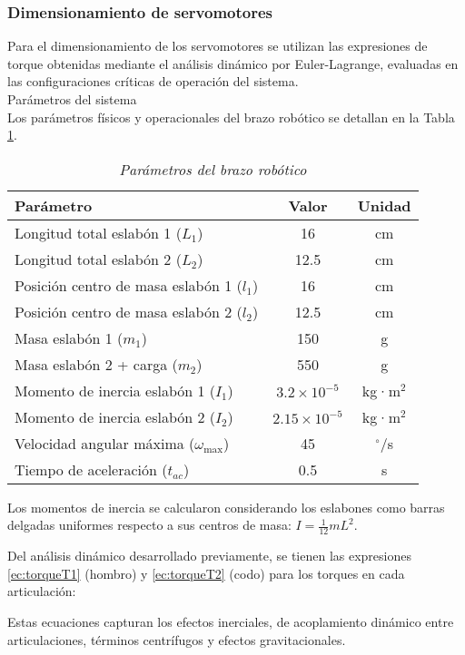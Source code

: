 \subsubsection{Dimensionamiento de servomotores}

Para el dimensionamiento de los servomotores se utilizan las expresiones de torque obtenidas mediante el análisis dinámico por Euler-Lagrange, evaluadas en las configuraciones críticas de operación del sistema.\\

Parámetros del sistema\\
\noindent
Los parámetros físicos y operacionales del brazo robótico se detallan en la Tabla \ref{tab:parametros_brazo}.

\begin{table}[htbp]
\centering
\begin{tabular}{lcc}
\hline
\textbf{Parámetro} & \textbf{Valor} & \textbf{Unidad} \\
\hline
Longitud total eslabón 1 ($L_1$) & 16 & cm \\
Longitud total eslabón 2 ($L_2$) & 12.5 & cm \\
Posición centro de masa eslabón 1 ($l_1$) & 16 & cm \\
Posición centro de masa eslabón 2 ($l_2$) & 12.5 & cm \\
Masa eslabón 1 ($m_1$) & 150 & g \\
Masa eslabón 2 + carga ($m_2$) & 550 & g \\
Momento de inercia eslabón 1 ($I_1$) & $3.2 \times 10^{-5}$ & kg·m$^2$ \\
Momento de inercia eslabón 2 ($I_2$) & $2.15 \times 10^{-5}$ & kg·m$^2$ \\
Velocidad angular máxima ($\omega_{\max}$) & 45 & $^{\circ}$/s \\
Tiempo de aceleración ($t_{ac}$) & 0.5 & s \\
\hline
\end{tabular}
\caption{\textit{Parámetros del brazo robótico}}
\label{tab:parametros_brazo}
\end{table}

Los momentos de inercia se calcularon considerando los eslabones como barras delgadas uniformes respecto a sus centros de masa: $I = \frac{1}{12}mL^2$.

Del análisis dinámico desarrollado previamente, se tienen las expresiones \ref{ec:torqueT1} (hombro) y \ref{ec:torqueT2} (codo) para los torques en cada articulación:

Estas ecuaciones capturan los efectos inerciales, de acoplamiento dinámico entre articulaciones, términos centrífugos y efectos gravitacionales. \\

